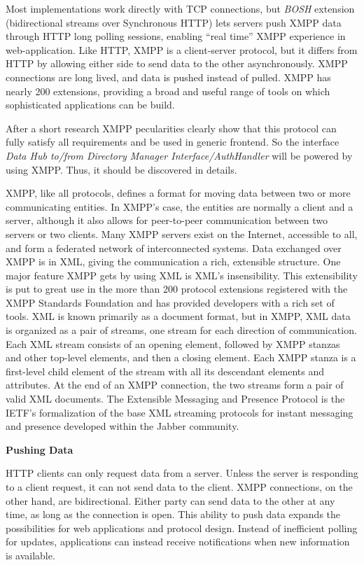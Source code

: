       Most implementations work directly with TCP connections, but \emph{BOSH} extension (bidirectional streams over Synchronous HTTP) lets servers push XMPP data through HTTP long polling sessions, enabling ``real time'' XMPP experience in web-application. Like HTTP, XMPP is a client-server protocol, but it differs from HTTP by allowing either side to send data to the other asynchronously. XMPP connections are long lived, and data is pushed instead of pulled. XMPP has nearly 200 extensions, providing a broad and useful range of tools on which sophisticated applications can be build. 

      After a short research XMPP pecularities clearly show that this protocol can fully satisfy all requirements and be used in generic frontend. So the interface \emph{Data Hub to/from Directory Manager Interface/AuthHandler} will be powered by using XMPP. Thus, it should be discovered in details.
   
      XMPP, like all protocols, defines a format for moving data between two or more communicating entities. In XMPP’s case, the entities are normally a client and a server, although it also allows for peer-to-peer communication between two servers or two clients. Many XMPP servers exist on the Internet, accessible to all, and form a federated network of interconnected systems. Data exchanged over XMPP is in XML, giving the communication a rich, extensible structure. One major feature XMPP gets by using XML is XML's insensibility. This extensibility is put to great use in the more than 200 protocol extensions registered with the XMPP Standards Foundation and has provided developers with a rich set of tools. XML is known primarily as a document format, but in XMPP, XML data is organized as a pair of streams, one stream for each direction of communication. Each XML stream consists of an opening element, followed by XMPP stanzas and other top-level elements, and then a closing element. Each XMPP stanza is a first-level child element of the stream with all its descendant elements and attributes. At the end of an XMPP connection, the two streams form a pair of valid XML documents. The Extensible Messaging and Presence Protocol is the IETF's formalization of the base XML streaming protocols for instant messaging and presence developed within the Jabber community\cite{xmpp}.

      \textbf{Pushing Data}

      HTTP clients can only request data from a server. Unless the server is responding to a client request, it can not send data to the client. XMPP connections, on the other hand, are bidirectional. Either party can send data to the other at any time, as long as the connection is open. This ability to push data expands the possibilities for web applications and protocol design. Instead of inefficient polling for updates, applications can instead receive notifications when new information is available.

